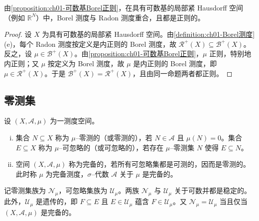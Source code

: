 \documentclass[../../main.tex]{subfiles}%
\begin{document}
\begin{remark}\label{remark:ch01-BorelRadon一致}
由\cref{proposition:ch01-可数基Borel正则}，在具有可数基的局部紧 Hausdorff 空间（例如 $\mathbb{R}^N$）中，Borel 测度与 Radon 测度重合，且都是正则的。
\end{remark}

\begin{proof}
设 $X$ 为具有可数基的局部紧 Hausdorff 空间。由\cref{definition:ch01-Borel测度}(e)，每个 Radon 测度按定义是内正则的 Borel 测度，故 $\mathcal{R}^+(X)\subseteq\mathcal{B}^+(X)$。反之，设 $\mu\in\mathcal{B}^+(X)$。由\cref{proposition:ch01-可数基Borel正则}，$\mu$ 正则，特别地内正则；又 $\mu$ 按定义为 Borel 测度，故 $\mu$ 是内正则的 Borel 测度，即 $\mu\in\mathcal{R}^+(X)$。于是 $\mathcal{B}^+(X)=\mathcal{R}^+(X)$，且由同一命题两者都正则。
\end{proof}

\subsection{零测集}\label{subsection:ch01-零测集}

\begin{definition}\label{definition:ch01-零测集}
设 $(X,\mathcal{A},\mu)$ 为一测度空间。
\begin{enumerate}[(i)]
\item 集合 $N\subseteq X$ 称为 $\mu$--零测的（或零测的），若 $N\in\mathcal{A}$ 且 $\mu(N)=0$。集合 $E\subseteq X$ 称为 $\mu$--可忽略的（或可忽略的），若存在 $\mu$--零测集 $N$ 使得 $E\subseteq N$。
\item 空间 $(X,\mathcal{A},\mu)$ 称为完备的，若所有可忽略集都是可测的，因而是零测的。此时称 $\mu$ 为完备测度，$\sigma$--代数 $\mathcal{A}$ 关于 $\mu$ 是完备的。
\end{enumerate}
\end{definition}

记零测集族为 $\mathcal{N}_\mu$，可忽略集族为 $\mathcal{U}_\mu$。两族 $\mathcal{N}_\mu$ 与 $\mathcal{U}_\mu$ 关于可数并都是稳定的。此外，$\mathcal{U}_\mu$ 是遗传的，即 $F\subseteq E$ 且 $E\in\mathcal{U}_\mu$ 蕴含 $F\in\mathcal{U}_\mu$。又 $\mathcal{N}_\mu=\mathcal{U}_\mu$ 当且仅当 $(X,\mathcal{A},\mu)$ 是完备的。
\end{document}
